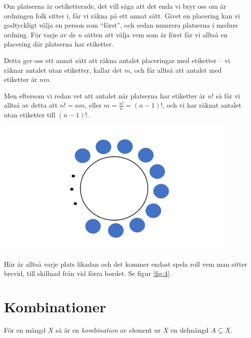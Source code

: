 \documentclass{tufte-handout}
\begin{document}
\begin{example}
	Om platserna är oetiketterade, det vill säga att det enda vi bryr oss om är ordningen folk sitter i, får vi räkna på ett annat sätt. Givet en placering kan vi godtyckligt välja en person som ``först'', och sedan numrera platserna i medurs ordning. För varje av de $n$ sätten att välja vem som är först får vi alltså en placering där platserna har etiketter.

	Detta ger oss ett annat sätt att räkna antalet placeringar med etiketter -- vi räknar antalet utan etiketter, kallar det $m$, och får alltså att antalet med etiketter är $nm$.

	Men eftersom vi redan vet att antalet när platserna har etiketter är $n!$ så får vi alltså av detta att $n! = nm$, eller $m = \frac{n!}{n} = (n-1)!$, och vi har räknat antalet utan etiketter till $(n-1)!$.
 
 \begin{center}
      \includegraphics[width=0.9\textwidth]{graphics/bordutanfarg1.png}
 \end{center}

       Här är alltså varje plats likadan och det kommer endast spela roll vem man sitter brevid, till skillnad från vid förra bordet. Se figur \ref{fig:4}.  
\end{example}
\section{Kombinationer}

\begin{definition}
	För en mängd $X$ så är en \emph{kombination} av element ur $X$ en delmängd $A \subseteq X$.
\end{definition}
\end{document}
